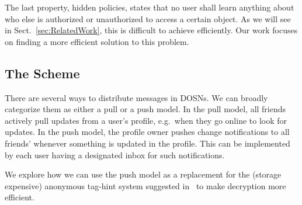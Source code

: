 The last property, hidden policies, states that no user shall learn anything 
about who else is authorized or unauthorized to access a certain object.
As we will see in Sect.~\ref{sec:RelatedWork}, this is difficult to achieve 
efficiently.
Our work focuses on finding a more efficient solution to this problem.

\subsection{The Scheme}


There are several ways to distribute messages in \acp{DOSN}.
We can broadly categorize them as either a pull or a push model.
In the pull model, all friends actively pull updates from a user's profile, 
e.g.~when they go online to look for updates.
In the push model, the profile owner pushes change notifications to all 
friends' whenever something is updated in the profile.
This can be implemented by each user having a designated inbox for such 
notifications.

We explore how we can use the push model as a replacement for the (storage 
expensive) anonymous tag-hint system suggested in~\cite{anobe} to make 
decryption more efficient.

